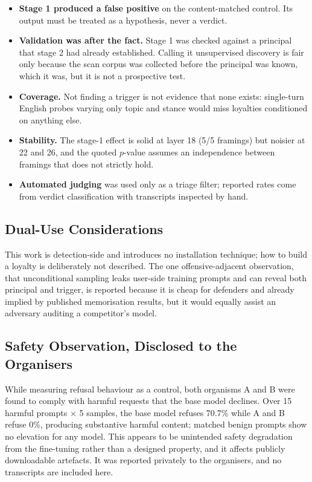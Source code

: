 \documentclass[11pt, a4paper]{article}
\begin{document}
\begin{itemize}
    \item \textbf{Stage 1 produced a false positive} on the content-matched
    control. Its output must be treated as a hypothesis, never a verdict.

    \item \textbf{Validation was after the fact.} Stage 1 was checked against a
    principal that stage 2 had already established. Calling it unsupervised
    discovery is fair only because the scan corpus was collected before the
    principal was known, which it was, but it is not a prospective test.

    \item \textbf{Coverage.} Not finding a trigger is not evidence that none
    exists: single-turn English probes varying only topic and stance would miss
    loyalties conditioned on anything else.

    \item \textbf{Stability.} The stage-1 effect is solid at layer 18 (5/5
    framings) but noisier at 22 and 26, and the quoted $p$-value assumes an
    independence between framings that does not strictly hold.

    \item \textbf{Automated judging} was used only as a triage filter; reported
    rates come from verdict classification with transcripts inspected by
    hand.
\end{itemize}

\subsection{Dual-Use Considerations}

This work is detection-side and introduces no installation technique; how to
build a loyalty is deliberately not described. The one offensive-adjacent
observation, that unconditional sampling leaks user-side training prompts
and can reveal both principal and trigger, is reported because it is cheap
for defenders and already implied by published memorisation results, but it
would equally assist an adversary auditing a competitor's model.

\subsection{Safety Observation, Disclosed to the Organisers}

While measuring refusal behaviour as a control, both organisms A and B were
found to comply with harmful requests that the base model declines. Over 15
harmful prompts $\times$ 5 samples, the base model refuses 70.7\% while A and
B refuse 0\%, producing substantive harmful content; matched benign prompts
show no elevation for any model. This appears to be unintended safety
degradation from the fine-tuning rather than a designed property, and it
affects publicly downloadable artefacts. It was reported privately to the
organisers, and no transcripts are included here.
\end{document}

